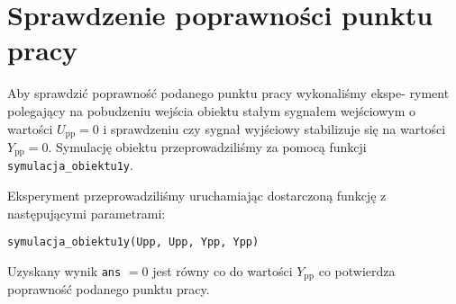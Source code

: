 \chapter{Sprawdzenie poprawności punktu pracy}

Aby sprawdzić poprawność podanego punktu pracy wykonaliśmy ekspe-
ryment polegający na pobudzeniu wejścia obiektu stałym sygnałem wejściowym o wartości
$U_{\mathrm{pp}} = 0$ i sprawdzeniu czy sygnał wyjściowy stabilizuje się 
na wartości $Y_{\mathrm{pp}} = 0$. Symulację obiektu przeprowadziliśmy
za pomocą funkcji \verb+symulacja_obiektu1y+. 

Eksperyment przeprowadziliśmy uruchamiając dostarczoną funkcję z następującymi parametrami:

\begin{center}
\verb+symulacja_obiektu1y(Upp, Upp, Ypp, Ypp)+ 
\end{center}

Uzyskany wynik \verb+ans+ $= 0$ jest równy co do wartości $Y_{\mathrm{pp}}$ co potwierdza poprawność podanego
punktu pracy.

